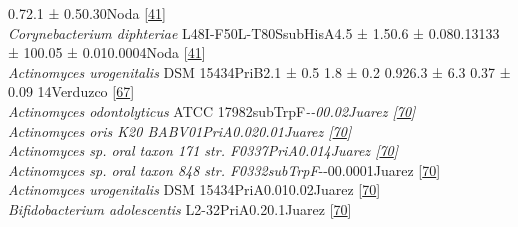 \documentclass[12pt,twoside]{reedthesis}
\begin{document}
  0.7\textbar{}2.1 ±
  0.5\textbar{}0.3\textbar{}\textbar{}\textbar{}0\textbar{}Noda
  {[}\protect\hyperlink{ref-noda-garcia_evolution_2013}{41}{]}\textbar{}\\
  \textbar{} \emph{Corynebacterium diphteriae}
  L48I-F50L-T80S\textbar{}subHisA\textbar{}\textbar{}\textbar{}4.5 ±
  1.5\textbar{}0.6 ± 0.08\textbar{}0.13\textbar{}133 ± 10\textbar{}0.05 ±
  0.01\textbar{}0.0004\textbar{}Noda
  {[}\protect\hyperlink{ref-noda-garcia_evolution_2013}{41}{]}\textbar{}\\
  \textbar{} \emph{Actinomyces urogenitalis} DSM
  15434\textbar{}PriB\textbar{}\emph{\textbar{}}\textbar{}2.1 ± 0.5
  \textbar{}1.8 ± 0.2 \textbar{}0.9\textbar{}26.3 ± 6.3\textbar{} 0.37 ±
  0.09 \textbar{}14\textbar{}Verduzco
  {[}\protect\hyperlink{ref-verduzco-castro_co-occurrence_2016}{67}{]}\textbar{}\\
  \textbar{} \emph{Actinomyces odontolyticus} ATCC
  17982\textbar{}subTrpF\textbar{}\textbar{}\emph{\textbar{}-\textbar{}-\textbar{}0\textbar{}\textbar{}\textbar{}0.02\textbar{}Juarez
  {[}\protect\hyperlink{ref-juarez-vazquez_evolution_2017}{70}{]}\textbar{}\\
  \textbar{} \emph{Actinomyces oris} K20
  BABV01\textbar{}PriA\textbar{}\textbar{}\textbar{}\textbar{}\textbar{}0.02\textbar{}\textbar{}\textbar{}0.01\textbar{}Juarez
  {[}\protect\hyperlink{ref-juarez-vazquez_evolution_2017}{70}{]}\textbar{}\\
  \textbar{} \emph{Actinomyces} sp. oral taxon 171 str.
  F0337\textbar{}PriA\textbar{}\textbar{}\textbar{}\textbar{}\textbar{}0.01\textbar{}\textbar{}\textbar{}4\textbar{}Juarez
  {[}\protect\hyperlink{ref-juarez-vazquez_evolution_2017}{70}{]}\textbar{}\\
  \textbar{} \emph{Actinomyces} sp. oral taxon 848 str.
  F0332\textbar{}subTrpF\textbar{}\textbar{}}\textbar{}-\textbar{}-\textbar{}0\textbar{}\textbar{}\textbar{}0.0001\textbar{}Juarez
  {[}\protect\hyperlink{ref-juarez-vazquez_evolution_2017}{70}{]}\textbar{}\\
  \textbar{} \emph{Actinomyces urogenitalis} DSM
  15434\textbar{}PriA\textbar{}\textbar{}\textbar{}\textbar{}\textbar{}0.01\textbar{}\textbar{}\textbar{}0.02\textbar{}Juarez
  {[}\protect\hyperlink{ref-juarez-vazquez_evolution_2017}{70}{]}\textbar{}\\
  \textbar{} \emph{Bifidobacterium adolescentis}
  L2-32\textbar{}PriA\textbar{}\emph{\textbar{}}\textbar{}\textbar{}\textbar{}0.2\textbar{}\textbar{}\textbar{}0.1\textbar{}Juarez
  {[}\protect\hyperlink{ref-juarez-vazquez_evolution_2017}{70}{]}\textbar{}\\
\end{document}
